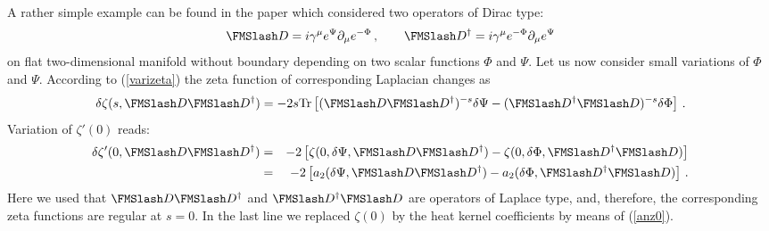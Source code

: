 A rather simple example can be found in the paper \cite{Kummer:1998dc}
which considered two operators of Dirac type:
\begin{equation}
\Dir =i\gamma^\mu e^{\Psi}\partial_\mu e^{-\Phi}\,,\qquad
\Dir^\dag =i\gamma^\mu e^{-\Phi}\partial_\mu e^{\Psi} \label{twoDir}
\end{equation}
on flat two-dimensional manifold without boundary
depending on two scalar functions $\Phi$ and $\Psi$. 
Let us now consider small variations
of $\Phi$ and $\Psi$. According to (\ref{varizeta}) the zeta function
of corresponding Laplacian changes as
\begin{equation}
\delta \zeta (s,\Dir\Dir^\dag )=
-2s {\rm Tr}\left[ (\Dir\Dir^\dag )^{-s} \delta\Psi -
(\Dir^\dag\Dir )^{-s} \delta \Phi \right] \,.\label{dzPP}
\end{equation}
Variation of $\zeta'(0)$ reads:
\begin{eqnarray}
\delta \zeta'(0,\Dir\Dir^\dag )&=&
-2\left[ \zeta(0,\delta \Psi,\Dir\Dir^\dag )-
\zeta (0,\delta\Phi,\Dir^\dag\Dir)\right] \nonumber\\
&=&-2\left[ a_2(\delta\Psi,\Dir\Dir^\dag)
-a_2(\delta\Phi,\Dir^\dag \Dir )\right]\,.\label{dzpPP}
\end{eqnarray} 
Here we used that $\Dir\Dir^\dag$ and $\Dir^\dag\Dir$ are operators
of Laplace type, and, therefore, the corresponding zeta functions
are regular at $s=0$. In the last line we replaced $\zeta (0)$ 
by the heat kernel coefficients by means of (\ref{anz0}).

